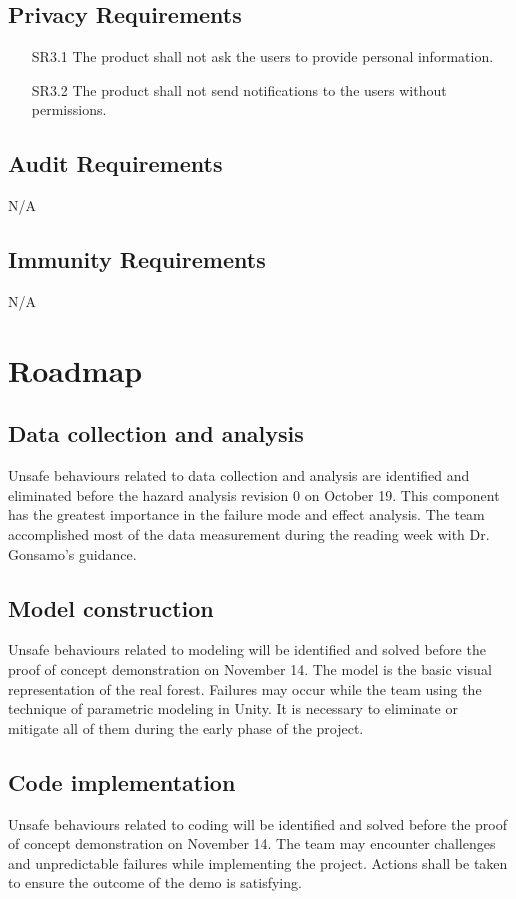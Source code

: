 \documentclass{article}
\begin{document}
\subsection{Privacy Requirements}
\begin{enumerate}
    \item[SR3.1] The product shall not ask the users to provide personal information.\\
    \item[SR3.2] The product shall not send notifications to the users without permissions.\\
\end{enumerate}

\subsection{Audit Requirements}
 N/A

\subsection{Immunity Requirements}
N/A


\newpage

\section{Roadmap}
\subsection{Data collection and analysis}
Unsafe behaviours related to data collection and analysis are identified and
eliminated before the hazard analysis revision 0 on October 19. This component has
the greatest importance in the failure mode and effect analysis. The team
accomplished most of the data measurement during the reading week with Dr.
Gonsamo's guidance.

\subsection{Model construction}
Unsafe behaviours related to modeling will be identified and solved before the
proof of concept demonstration on November 14. The model is the basic visual
representation of the real forest. Failures may occur while the team using the
technique of parametric modeling in Unity. It is necessary to eliminate or
mitigate all of them during the early phase of the project.

\subsection{Code implementation}
Unsafe behaviours related to coding will be identified and solved before the proof
of concept demonstration on November 14. The team may encounter challenges and
unpredictable failures while implementing the project. Actions shall be taken to
ensure the outcome of the demo is satisfying.
\end{document}
